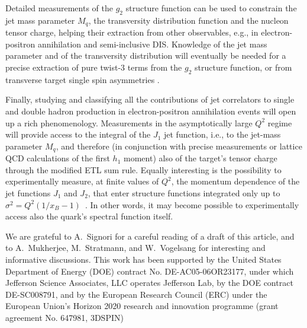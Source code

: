 \documentclass[preprintnumbers,floatfix,nofootinbib]{revtex4}
\newcommand{\mj}{M_q}
\begin{document}
Detailed measurements of the $g_2$ structure
function can be used to constrain the jet mass parameter $M_q$, the transversity
distribution function and the nucleon tensor charge, helping their extraction from other observables, e.g., in electron-positron annihilation and semi-inclusive DIS. Knowledge of the jet mass parameter and of the transversity distribution will eventually be needed for a precise extraction of pure twist-3 terms from the $g_2$ structure function, or from transverse target single spin asymmetries \cite{Schlegel:2012ve}.

Finally, studying and classifying all the contributions of jet correlators to single and double hadron production in electron-positron annihilation events will open up a rich phenomenology. Measurements in the asymptotically large $Q^2$ regime will provide access to the integral of the $J_1$ jet function, i.e., to the jet-mass parameter $\mj$, and therefore (in conjunction with precise measurements or lattice QCD calculations of the first $h_1$ moment) also of the target's tensor charge through the modified ETL sum rule. 
Equally interesting is the possibility to experimentally measure, at finite values of $Q^2$, the momentum dependence of the jet functions $J_1$ and $J_2$, that enter structure functions integrated only up to $\sigma^2=Q^2(1/x_B-1)$~\cite{Accardi:2008ne}. In other words, it may become possible to experimentally access also the quark's spectral function itself.





\begin{acknowledgments}
We are grateful to A.~Signori for a careful reading of a draft of this article, and to A.~Mukherjee, M.~Stratmann, and W.~Vogelsang for interesting and informative discussions. This work has been supported by the United States Department of Energy (DOE) contract No. DE-AC05-06OR23177,
under which Jefferson Science Associates, LLC operates Jefferson Lab, by the DOE contract DE-SC008791, and 
by the European Research Council (ERC) under the European Union's 
Horizon 2020 research and innovation programme (grant agreement No. 647981,
3DSPIN)
\end{acknowledgments}



\end{document}
